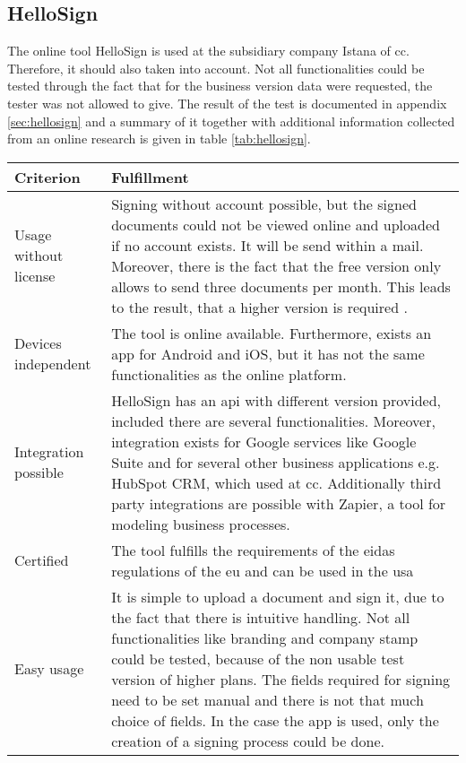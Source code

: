 
\subsection{HelloSign}
The online tool HelloSign is used at the subsidiary company Istana of \gls{cc}. Therefore, it should also taken into account. Not all functionalities could be tested through the fact that for the business version data were requested, the tester was not allowed to give. The result of the test is documented in appendix \ref{sec:hellosign} and a summary of it together with additional information collected from an online research is given in table \ref{tab:hellosign}.
\begin{table}[h!]
	\begin{tabular}{|p{4cm}|p{10cm}|} \hline
		Criterion & Fulfillment \\ \hline
		Usage without license & Signing without account possible, but the signed documents could not be viewed online and uploaded if no account exists. It will be send within a mail. Moreover, there is the fact that the free version only allows to send three documents per month. This leads to the result, that a higher version is required \parencite{hellosign2018price}. \\ \hline
		Devices independent & The tool is online available. Furthermore, exists an \gls{app} for Android and iOS, but it has not the same functionalities as the online platform.  \parencite{hellosign2018legal} \\ \hline
		Integration possible & HelloSign has an \gls{api} with different version provided, included there are several functionalities. Moreover, integration exists for Google services like Google Suite and for several other business applications e.g. HubSpot CRM, which used at \gls{cc}. Additionally third party integrations are possible with Zapier, a tool for modeling business processes. \parencite{hellosign2018integration,hellosign2018api} \\ \hline
		Certified & The tool fulfills the requirements of the \gls{eidas} regulations of the \gls{eu} and can be used in the \gls{usa} \parencite{hellosign2018legal} \\ \hline
		Easy usage & It is simple to upload a document and sign it, due to the fact that there is intuitive handling. Not all functionalities like branding and company stamp could be tested, because of the non usable test version of higher plans. The fields required for signing need to be set manual and there is not that much choice of fields. In the case the \gls{app} is used, only the creation of a signing process could be done. \\ \hline

\end{tabular}
\end{table}
